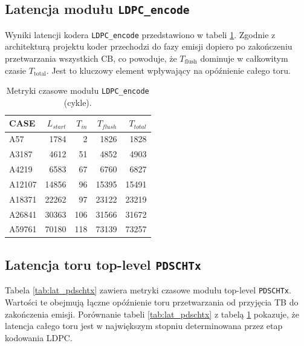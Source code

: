 \subsection{Latencja modułu \texttt{LDPC\_encode}}
\label{subsec:lat_ldpc_encode}

Wyniki latencji kodera \texttt{LDPC\_encode} przedstawiono w tabeli \ref{tab:lat_ldpc_encode}.
Zgodnie z architekturą projektu koder przechodzi do fazy emisji dopiero po zakończeniu przetwarzania wszystkich CB,
co powoduje, że $T_{\mathrm{flush}}$ dominuje w całkowitym czasie $T_{\mathrm{total}}$.
Jest to kluczowy element wpływający na opóźnienie całego toru.


\begin{table}[!ht]
\centering
\caption{Metryki czasowe modułu \texttt{LDPC\_encode} (cykle).}
\label{tab:lat_ldpc_encode}
\begin{tabular}{lrrrr}
\hline
CASE & $L_{start}$ & $T_{in}$ & $T_{flush}$ & $T_{total}$ \\
\hline
A57     & 1784  & 2   & 1826  & 1828 \\
A3187   & 4612  & 51  & 4852  & 4903 \\
A4219   & 6583  & 67  & 6760  & 6827 \\
A12107  & 14856 & 96  & 15395 & 15491 \\
A18371  & 22262 & 97  & 23122 & 23219 \\
A26841  & 30363 & 106 & 31566 & 31672 \\
A59761  & 70180 & 118 & 73139 & 73257 \\
\hline
\end{tabular}
\end{table}

\subsection{Latencja toru top-level \texttt{PDSCHTx}}
\label{subsec:lat_pdschtx}

Tabela \ref{tab:lat_pdschtx} zawiera metryki czasowe modułu top-level \texttt{PDSCHTx}.
Wartości te obejmują łączne opóźnienie toru przetwarzania od przyjęcia TB do zakończenia emisji.
Porównanie tabeli \ref{tab:lat_pdschtx} z tabelą \ref{tab:lat_ldpc_encode} pokazuje,
że latencja całego toru jest w największym stopniu determinowana przez etap kodowania LDPC.


